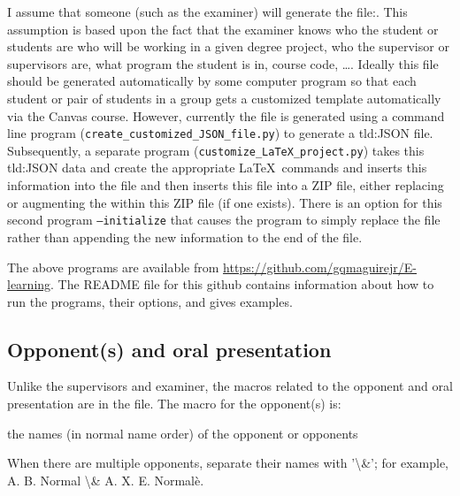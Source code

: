 I assume that someone (such as the examiner) will generate the file:\linebreak[4] . This assumption is based upon the fact that the examiner knows who the student or students are who will be working in a given degree project, who the supervisor or supervisors are, what program the student is in, course code, \ldots . Ideally this file should be generated automatically by some computer program so that each student or pair of students in a group gets a customized template automatically via the Canvas course. However, currently the file is generated using a command line program (\texttt{create\_customized\_JSON\_file.py}) to generate a \gls{tld:JSON} file. Subsequently, a separate program (\texttt{customize\_LaTeX\_project.py}) takes this \gls{tld:JSON} data and create the appropriate \LaTeX\ commands and inserts this information into the file and then inserts this file into a ZIP file, either replacing or augmenting the  within this ZIP file (if one exists). There is an option for this second program \texttt{--initialize} that causes the program to simply replace the file rather than appending the new information to the end of the file.

The above programs are available from \url{https://github.com/gqmaguirejr/E-learning}. The README file for this github contains information about how to run the programs, their options, and gives examples.

\subsection{Opponent(s) and oral presentation}
\label{sec:opponentMacros}
Unlike the supervisors and examiner, the macros related to the opponent and oral presentation are in the  file.
The macro for the opponent(s) is: 
\begin{description}[leftmargin=!, labelwidth =\widthof{\texttt{\textbackslash secondAuthorsFirstname\{\}}}]
\item [\texttt{\textbackslash opponentsNames\{\}}] the names (in normal name order) of the opponent or opponents
\end{description}
When there are multiple opponents, separate their names with '\textbackslash \&'; for example, A. B. Normal \textbackslash \& A. X. E. Normalè.

